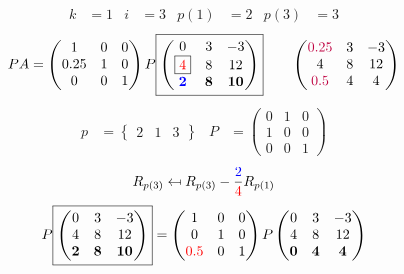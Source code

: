 \documentclass[pdf]{beamer}
\begin{document}
\begin{frame}{}\begin{align*} k &= 1 & i &= 3 & p(1) &= 2 & p(3) &= 3\end{align*} $$PA=\begin{pmatrix}1&0&0\\0.25&1&0\\0&0&1\end{pmatrix} P \boxed{\begin{pmatrix}0&3&-3\\\boxed{{\color{red}4}}&8&12\\\mathbf{{\color{blue}2}}&\mathbf{8}&\mathbf{10}\end{pmatrix}} \quad\quad \begin{pmatrix}{\color{purple}0.25}&3&-3\\4&8&12\\{\color{purple}0.5}&4&4\end{pmatrix}$$ \begin{align*} p&= \begin{Bmatrix}2&1&3\end{Bmatrix} & P&= \begin{pmatrix}0&1&0\\1&0&0\\0&0&1\end{pmatrix} \end{align*} $$R_{p(3)} \mapsfrom R_{p(3)} - \frac{{\color{blue}2}}{{\color{red}4}} R_{p(1)}$$ $$ P \boxed{\begin{pmatrix}0&3&-3\\4&8&12\\\mathbf{2}&\mathbf{8}&\mathbf{10}\end{pmatrix}} = \begin{pmatrix}1&0&0\\0&1&0\\{\color{red}0.5}&0&1\end{pmatrix} P \begin{pmatrix}0&3&-3\\4&8&12\\\mathbf{0}&\mathbf{4}&\mathbf{4}\end{pmatrix} $$\end{frame}
\end{document}
